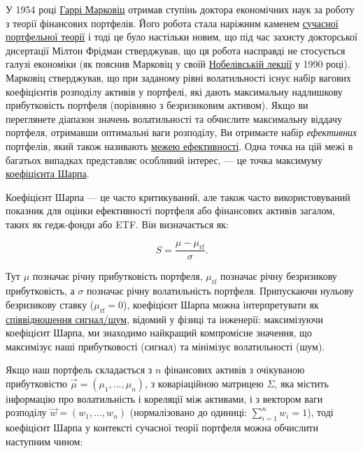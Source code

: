 \documentclass[
  letterpaper,
]{report}
\begin{document}
У 1954 році \href{https://en.wikipedia.org/wiki/Harry_Markowitz}{Гаррі
Марковіц} отримав ступінь доктора економічних наук за роботу з теорії
фінансових портфелів. Його робота стала наріжним каменем
\href{https://en.wikipedia.org/wiki/Modern_portfolio_theory}{сучасної
портфельної теорії} і тоді це було настільки новим, що під час захисту
докторської дисертації Мілтон Фрідман стверджував, що ця робота
насправді не стосується галузі економіки (як пояснив Марковіц у своїй
\href{http://nobelprize.org/nobel_prizes/economics/laureates/1990/markowitz-lecture.html}{Нобелівській
лекції} у 1990 році). Марковіц стверджував, що при заданому рівні
волатильності існує набір вагових коефіцієнтів розподілу активів у
портфелі, які дають максимальну надлишкову прибутковість портфеля
(порівняно з безризиковим активом). Якщо ви переглянете діапазон значень
волатильності та обчислите максимальну віддачу портфеля, отримавши
оптимальні ваги розподілу, Ви отримаєте набір \emph{ефективних}
портфелів, який також називають
\href{https://en.wikipedia.org/wiki/Efficient_frontier}{межею
ефективності}. Одна точка на цій межі в багатьох випадках представляє
особливий інтерес, --- це точка максимуму
\href{https://en.wikipedia.org/wiki/Sharpe_ratio}{коефіцієнта Шарпа}.

Коефіцієнт Шарпа --- це часто критикуваний, але також часто
використовуваний показник для оцінки ефективності портфеля або
фінансових активів загалом, таких як гедж-фонди або ETF. Він
визначається як:

\[
S = \frac{\mu - \mu_{\text{rf}}}{\sigma}.
\]

Тут \(\mu\) позначає річну прибутковість портфеля, \(\mu_{\text{rf}}\)
позначає річну безризикову прибутковість, а \(\sigma\) позначає річну
волатильність портфеля. Припускаючи нульову безризикову ставку
(\(\mu_{\text{rf}} = 0\)), коефіцієнт Шарпа можна інтерпретувати як
\href{https://en.wikipedia.org/wiki/Signal-to-noise_ratio}{співвідношення
сигнал/шум}, відомий у фізиці та інженерії: максимізуючи коефіцієнт
Шарпа, ми знаходимо найкращий компромісне значення, що максимізує наші
прибутковості (сигнал) та мінімізує волатильності (шум).

Якщо наш портфель складається з \(n\) фінансових активів з очікуваною
прибутковістю \(\vec{\mu} = (\mu_{1},...,\mu_{n})\), з коваріаційною
матрицею \(\Sigma\), яка містить інформацію про волатильність і
кореляції між активами, і з вектором ваги розподілу
\(\vec{w} = (w_1,...,w_n)\) (нормалізовано до одиниці:
\(\sum_{i=1}^n w_i = 1\)), тоді коефіцієнт Шарпа у контексті сучасної
теорії портфеля можна обчислити наступним чином:
\end{document}
